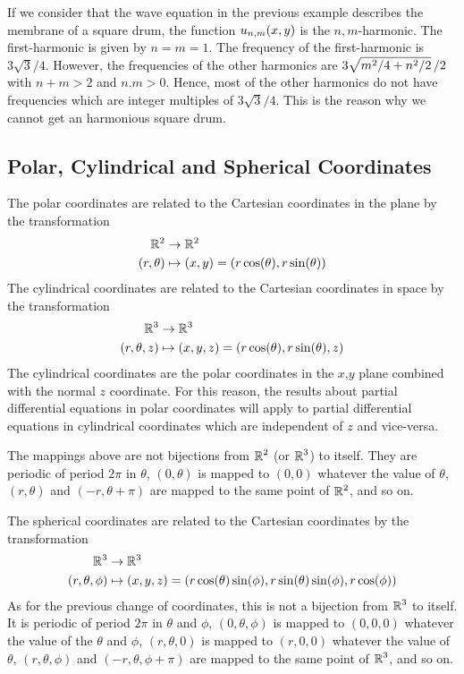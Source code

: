 \begin{rmk}
If we consider that the wave equation in the previous example describes the
membrane of a square drum, the function
$\displaystyle u_{n,m}(x,y)$ is the $n,m$-harmonic.  The
first-harmonic is given by $n=m=1$.  The frequency of the
first-harmonic is $3\sqrt{3}/4$.  However, the frequencies of the
other harmonics are $\displaystyle 3\sqrt{m^2/4 + n^2/2}\,/2$ with $n+m >2$ and
$n.m>0$.  Hence, most of the other harmonics do not have frequencies
which are integer multiples of $3\sqrt{3}/4$.  This is the reason why
we cannot get an harmonious square drum.
\end{rmk}

\subsection{Polar, Cylindrical and Spherical Coordinates}
\label{wave_cyl_sph_coord}

The polar coordinates are related to the Cartesian coordinates in the
plane by the transformation
\begin{align*}
\mathbb{R}^2 & \rightarrow \mathbb{R}^2 \\
(r,\theta) & \mapsto (x,y) = (r \cos(\theta), r\sin(\theta))
\end{align*}
The cylindrical coordinates are related to the Cartesian coordinates
in space by the transformation
\begin{align*}
\mathbb{R}^3 & \rightarrow \mathbb{R}^3 \\
(r,\theta, z) & \mapsto (x,y,z) = (r \cos(\theta), r\sin(\theta), z)
\end{align*}
The cylindrical coordinates are the polar coordinates in the $x$,$y$
plane combined with the normal $z$ coordinate.  For this reason, the
results about partial differential equations in polar coordinates will
apply to partial differential equations in 
cylindrical coordinates which are independent of $z$ and vice-versa.

The mappings above are not bijections from $\displaystyle \mathbb{R}^2$ (or
$\displaystyle \mathbb{R}^3$) to itself.  They are periodic of period $2\pi$
in $\theta$, $(0,\theta)$ is mapped to $(0,0)$ whatever the value of $\theta$,
$(r,\theta)$ and $(-r, \theta+\pi)$ are mapped to the same point
of $\displaystyle \mathbb{R}^2$, and so on.

The spherical coordinates are related to the Cartesian coordinates by
the transformation
\begin{align*}
\mathbb{R}^3 & \rightarrow \mathbb{R}^3 \\
(r,\theta, \phi) & \mapsto (x,y,z) =
(r \cos(\theta)\sin(\phi), r\sin(\theta)\sin(\phi), r \cos(\phi))
\end{align*}
As for the previous change of coordinates, this is not a bijection
from $\displaystyle \mathbb{R}^3$ to itself.  It is periodic of period $2\pi$
in $\theta$ and $\phi$, $(0,\theta, \phi)$ is mapped to $(0,0,0)$ whatever the
value of the $\theta$ and $\phi$, $(r,\theta, 0)$ is mapped to
$(r,0,0)$ whatever the value of $\theta$, $(r,\theta, \phi)$ and $(-r,
\theta, \phi+\pi)$ are mapped to the same point of
$\displaystyle \mathbb{R}^3$, and so on.

